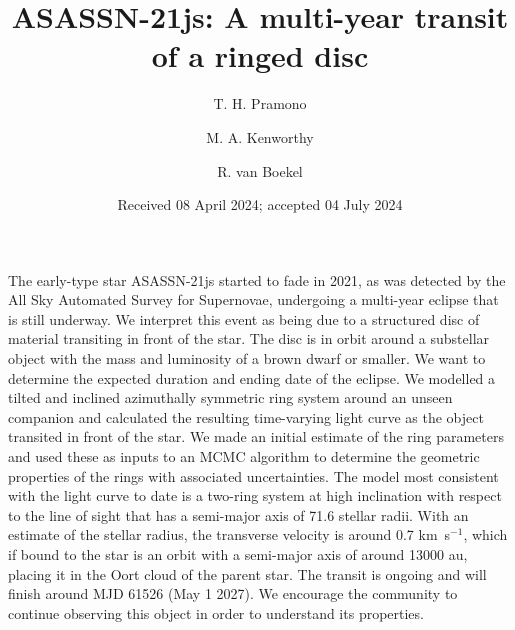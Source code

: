\documentclass[letter]{aa} %
\newcommand{\kms}{km~s$^{-1}$}
\begin{document}
   \title{ASASSN-21js: A multi-year transit of a ringed disc}

   \author{T. H. Pramono
          \and
          M. A. Kenworthy
          \and
          R. van Boekel
          }
   \date{Received 08 April 2024; accepted 04 July 2024}

 
  \abstract
  {}  
   {The early-type star ASASSN-21js started to fade in 2021, as was detected by the All Sky Automated Survey for Supernovae, undergoing a multi-year eclipse that is still underway.
   We interpret this event as being due to a structured disc of material transiting in front of the star.
   The disc is in orbit around a substellar object with the mass and luminosity of a brown dwarf or smaller.
   We want to determine the expected duration and ending date of the eclipse.}
   {We modelled a tilted and inclined azimuthally symmetric ring system around an unseen companion and calculated the resulting time-varying light curve as the object transited in front of the star.
   We made an initial estimate of the ring parameters and used these as inputs to an MCMC algorithm to determine the geometric properties of the rings with associated uncertainties.}
   {The model most consistent with the light curve to date is a two-ring system at high inclination with respect to the line of sight that has a semi-major axis of 71.6 stellar radii.
   With an estimate of the stellar radius, the transverse velocity is around 0.7 \kms{}, which if bound to the star is an orbit with a semi-major axis of around 13000 au, placing it in the Oort cloud of the parent star.
   The transit is ongoing and will finish around MJD 61526 (May 1 2027).
   We encourage the community to continue observing this object in order to understand its properties.}
   {}


   \maketitle
%
\end{document}
